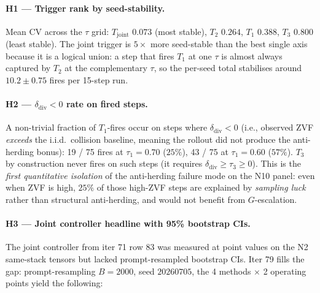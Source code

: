 \documentclass{article}
\begin{document}
\paragraph{H1 --- Trigger rank by seed-stability.}
Mean CV across the $\tau$ grid: $T_{\mathrm{joint}}$ $0.073$
(most stable), $T_2$ $0.264$, $T_1$ $0.388$, $T_3$ $0.800$ (least
stable).  The joint trigger is $5\times$ more seed-stable than the
best single axis because it is a logical union: a step that fires
$T_1$ at one $\tau$ is almost always captured by $T_2$ at the
complementary $\tau$, so the per-seed total stabilises around
$10.2 \pm 0.75$ fires per 15-step run.

\paragraph{H2 --- $\delta_{\mathrm{div}}{<}0$ rate on fired steps.}
A non-trivial fraction of $T_1$-fires occur on steps where
$\delta_{\mathrm{div}}{<}0$ (i.e., observed ZVF \emph{exceeds} the
i.i.d.\ collision baseline, meaning the rollout did not produce the
anti-herding bonus): 19 / 75 fires at $\tau_1{=}0.70$
($25\%$), 43 / 75 at $\tau_1{=}0.60$ ($57\%$).  $T_3$ by
construction never fires on such steps (it requires
$\delta_{\mathrm{div}} \geq \tau_3 \geq 0$).  This is the
\emph{first quantitative isolation} of the anti-herding failure mode
on the N10 panel: even when ZVF is high, $25\%$ of those
high-ZVF steps are explained by \emph{sampling luck} rather than
structural anti-herding, and would not benefit from $G$-escalation.

\paragraph{H3 --- Joint controller headline with 95\% bootstrap CIs.}
The joint controller from iter 71 row 83 was measured at point values
on the N2 same-stack tensors but lacked prompt-resampled bootstrap
CIs.  Iter 79 fills the gap: prompt-resampling $B{=}2000$,
seed $20260705$, the 4 methods $\times$ 2 operating points yield the
following:
\end{document}
